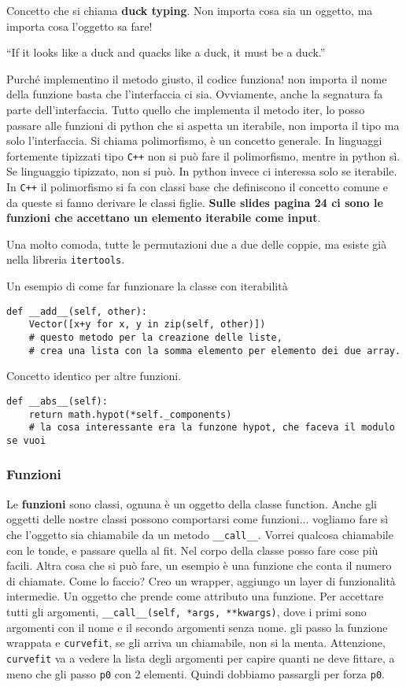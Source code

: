 \documentclass[10pt, a4paper, titlepage]{book}
\begin{document}
Concetto che si chiama \textbf{duck typing}. Non importa cosa sia un oggetto, ma importa cosa l'oggetto sa fare!


``If it looks like a duck and quacks like a duck, it must be a duck.''


Purché implementino il metodo giusto, il codice funziona! non importa il nome della funzione basta che l'interfaccia ci sia. Ovviamente, anche la segnatura fa parte dell'interfaccia. Tutto quello che implementa il metodo iter, lo posso passare alle funzioni di python che si aspetta un iterabile, non importa il tipo ma solo l'interfaccia. Si chiama polimorfismo, è un concetto generale.
In linguaggi fortemente tipizzati tipo \texttt{C++} non si può fare il polimorfismo, mentre in python sì. Se linguaggio tipizzato, non si può. In python invece ci interessa solo se iterabile.
In \texttt{C++} il polimorfismo si fa con classi base che definiscono il concetto comune e da queste si fanno derivare le classi figlie.
\textbf{Sulle slides pagina 24 ci sono le funzioni che accettano un elemento iterabile come input}.

Una molto comoda, tutte le permutazioni due a due delle coppie, ma esiste già nella libreria \texttt{itertools}.

Un esempio di come far funzionare la classe con iterabilità

\begin{verbatim}
def __add__(self, other):
	Vector([x+y for x, y in zip(self, other)])
	# questo metodo per la creazione delle liste, 
	# crea una lista con la somma elemento per elemento dei due array.
\end{verbatim}

Concetto identico per altre funzioni.

\begin{verbatim}
def __abs__(self):
	return math.hypot(*self._components)
	# la cosa interessante era la funzone hypot, che faceva il modulo se vuoi
\end{verbatim}

\subsubsection{Funzioni}
Le \textbf{funzioni} sono classi, ognuna è un oggetto della classe function. Anche gli oggetti delle nostre classi possono comportarsi come funzioni... vogliamo fare sì che l'oggetto sia chiamabile da un metodo \texttt{__call__}. Vorrei qualcosa chiamabile con le tonde, e passare quella al fit. Nel corpo della classe posso fare cose più facili.
Altra cosa che si può fare, un esempio è una funzione che conta il numero di chiamate.
Come lo faccio? Creo un wrapper, aggiungo un layer di funzionalità intermedie.
Un oggetto che prende come attributo una funzione.
Per accettare tutti gli argomenti, \texttt{__call__(self, *args, **kwargs)}, dove i primi sono argomenti con il nome e il secondo argomenti senza nome.
gli passo la funzione wrappata e \texttt{curvefit}, se gli arriva un chiamabile, non si la menta.
Attenzione, \texttt{curvefit} va a vedere la lista degli argomenti per capire quanti ne deve fittare, a meno che gli passo \texttt{p0} con 2 elementi. Quindi dobbiamo passargli per forza \texttt{p0}.
\end{document}
